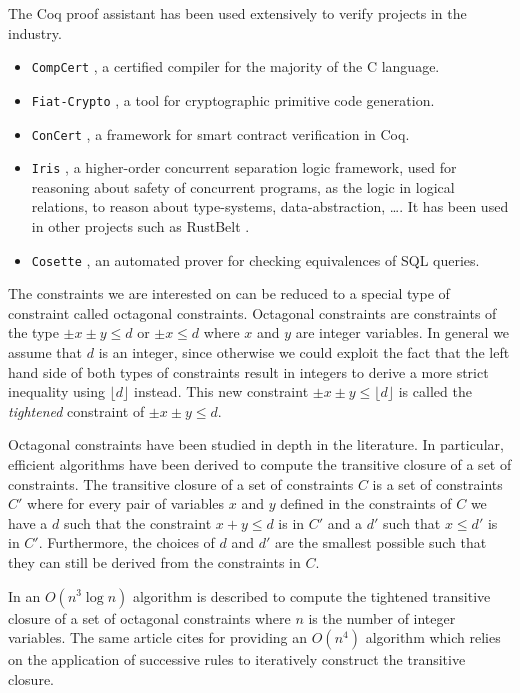The Coq proof assistant has been used extensively to verify projects in the industry.
\begin{itemize}
    \item \verb|CompCert| \cite{CompCert}, a certified compiler for the majority of the C language.
    \item \verb|Fiat-Crypto| \cite{FiatCryptoSP19}, a tool for cryptographic primitive code generation.
    \item \verb|ConCert| \cite{ConCert}, a framework for smart contract verification in Coq.
    \item \verb|Iris| \cite{Iris}, a higher-order concurrent separation logic framework, used for reasoning about safety of concurrent programs, as the logic in logical relations, to reason about type-systems, data-abstraction, \dots. It has been used in other projects such as RustBelt \cite{RustBelt}.
    \item \verb|Cosette| \cite{Cosette}, an automated prover for checking equivalences of SQL queries.
\end{itemize}

The constraints we are interested on can be reduced to a special type of constraint called
octagonal constraints. Octagonal constraints are constraints of the type ${\pm x \pm y \le d}$ 
or $\pm x \le d$ where $x$ and $y$ are integer variables. In general we assume that $d$ is an
integer, since otherwise we could exploit the fact that the left hand side of both types of
constraints result in integers to derive a more strict inequality using $\lfloor d \rfloor$
instead. This new constraint $\pm x \pm y \le \lfloor d \rfloor$ is called the \emph{tightened}
constraint of $\pm x \pm y \le d$.

Octagonal constraints have been studied in depth in the literature. In particular, efficient
algorithms have been derived to compute the transitive closure of a set of constraints. The
transitive closure of a set of constraints $C$ is a set of constraints $C'$ where for every
pair of variables $x$ and $y$ defined in the constraints of $C$ we have a $d$ such that
the constraint $x + y \le d$ is in $C'$ and a $d'$ such that $x \le d'$ is in $C'$. Furthermore,
the choices of $d$ and $d'$ are the smallest possible such that they can still be derived from
the constraints in $C$.

In \cite{TransitiveClosure} an $O(n^3\log{n})$ algorithm is described to compute the tightened 
transitive closure of a set of octagonal constraints where $n$ is the number of integer variables. The 
same article cites \cite{HarveyStuckey} for providing an $O(n^4)$ algorithm which relies on the 
application of successive rules to iteratively construct the transitive closure.